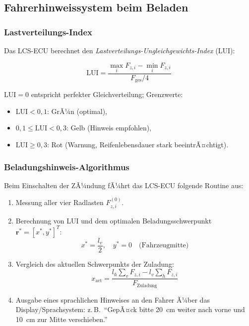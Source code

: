 ﻿\documentclass[12pt,a4paper]{article}
\theoremstyle{definition}
\theoremstyle{remark}
\begin{document}
\subsection{Fahrerhinweissystem beim Beladen}

\subsubsection{Lastverteilungs-Index}

Das LCS-ECU berechnet den \emph{Lastverteilungs-Ungleichgewichts-Index} (LUI):

\begin{equation}
  \mathrm{LUI} = \frac{\max_i F_{z,i} - \min_i F_{z,i}}{F_{\mathrm{ges}} / 4}
  \label{eq:lui}
\end{equation}

$\mathrm{LUI} = 0$ entspricht perfekter Gleichverteilung; Grenzwerte:
\begin{itemize}[nosep]
  \item $\mathrm{LUI} < 0{,}1$: GrÃ¼n (optimal),
  \item $0{,}1 \leq \mathrm{LUI} < 0{,}3$: Gelb (Hinweis empfohlen),
  \item $\mathrm{LUI} \geq 0{,}3$: Rot (Warnung, Reifenlebensdauer stark beeintrÃ¤chtigt).
\end{itemize}

\subsubsection{Beladungshinweis-Algorithmus}

Beim Einschalten der ZÃ¼ndung fÃ¼hrt das LCS-ECU folgende Routine aus:

\begin{enumerate}
  \item Messung aller vier Radlasten $F_{z,i}^{(0)}$.
  \item Berechnung von LUI und dem optimalen Beladungsschwerpunkt
        $\mathbf{r}^* = [x^*, y^*]^T$:
        \begin{equation}
          x^* = \frac{l_v}{2}, \quad
          y^* = 0
          \quad \text{(Fahrzeugmitte)}
          \label{eq:optimal_load_center}
        \end{equation}
  \item Vergleich des aktuellen Schwerpunkts der Zuladung:
        \begin{equation}
          x_{\mathrm{act}} = \frac{l_h \sum_v F_{z,i} - l_v \sum_h F_{z,i}}{F_{\mathrm{Zuladung}}}
          \label{eq:actual_cog}
        \end{equation}
  \item Ausgabe eines sprachlichen Hinweises an den Fahrer Ã¼ber das Display/Sprachsystem:
        z.\,B.\ ``GepÃ¤ck bitte \SI{20}{\centi\metre} weiter nach vorne und
        \SI{10}{\centi\metre} zur Mitte verschieben.''
\end{enumerate}
\end{document}
